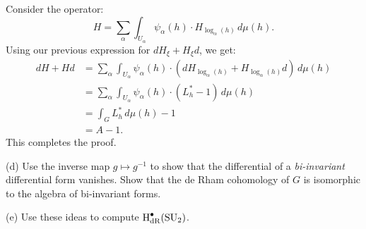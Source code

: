\documentclass{../../templates/lkx_pset}
\begin{document}
\begin{parts}
	Consider the operator:
	\[
    H = \sum_{\alpha} \int_{U_\alpha} \psi_\alpha(h)\cdot H_{\log_\alpha(h)} \,d\mu(h).
	\]
	Using our previous expression for $dH_\xi + H_\xi d$, we get:
	\[
    \begin{aligned}
      dH + Hd 
      &= \sum_\alpha \int_{U_\alpha} \psi_\alpha(h) \cdot (dH_{\log_\alpha(h)} + H_{\log_\alpha(h)}d)\,d\mu(h)\\
      &= \sum_\alpha \int_{U_\alpha} \psi_\alpha(h) \cdot (L^*_h - 1)\,d\mu(h)\\
      &= \int_G L^*_h\,d\mu(h) - 1\\
      &= A - 1.
    \end{aligned}
	\]
	This completes the proof.



	\begin{part}{(d)}
		Use the inverse map $g \mapsto g^{-1}$ to show that the differential of a \emph{bi-invariant} differential form vanishes. Show that the de Rham cohomology of $G$ is isomorphic to the algebra of bi-invariant forms.
	\end{part}

	\begin{part}{(e)}
		Use these ideas to compute $\operatorname{H}_{\operatorname{dR}}^\bullet(\operatorname{SU}_2)$.
	\end{part}
\end{parts}
\end{document}
